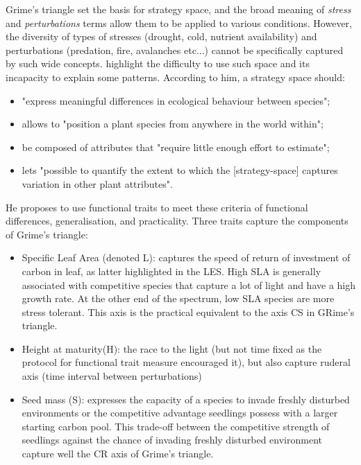 Grime's triangle set the basis for strategy space, and the broad meaning of \textit{stress} and \textit{perturbations} terms allow them to be applied to various conditions. However, the diversity of types of stresses (drought, cold, nutrient availability) and perturbations (predation, fire, avalanches etc...) cannot be specifically captured by such wide concepts. \cite{westoby_leaf-height-seed_1998} highlight the difficulty to use such space and its incapacity to explain some patterns. According to him, a strategy space should: 
\begin{itemize}
\item "express meaningful differences in ecological behaviour between species";
\item allows to "position a plant species from anywhere in the world within";
\item be composed of attributes that "require little enough effort to estimate";
\item lets "possible to quantify the extent to which the [strategy-space] captures variation in other plant attributes".
\end{itemize}
He proposes to use functional traits to meet these criteria of functional differences, generalisation, and practicality. Three traits capture the components of Grime's triangle:
\begin{itemize}
\item Specific Leaf Area (denoted L): captures the speed of return of investment of carbon in leaf, as latter highlighted in the LES. High SLA is generally associated with competitive species that capture a lot of light and have a high growth rate. At the other end of the spectrum, low SLA species are more stress tolerant. This axis is the practical equivalent to the axis CS in GRime's triangle.
\item Height at maturity(H): the race to the light (but not time fixed as the protocol for functional trait measure encouraged it), but also capture ruderal axis (time interval between perturbations)
\item Seed mass (S): expresses the capacity of a species to invade freshly disturbed environments or the competitive advantage seedlings possess with a larger starting carbon pool. This trade-off between the competitive strength of seedlings against the chance of invading freshly disturbed environment capture well the CR axis of Grime's triangle.
\end{itemize}

